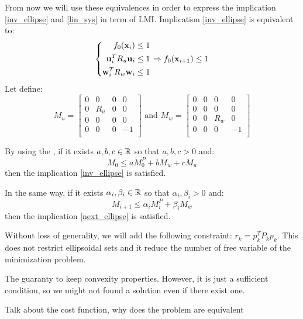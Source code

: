 From now we will use these equivalences in order to express the implication  \ref{inv_ellipse} and \ref{lin_sys} in term of LMI.
Implication \ref{inv_ellipse} is equivalent to:
\begin{equation}
\left\{
\begin{aligned}
f_0( \mathbf{x}_i)   &\leq 1\\
 \mathbf{u}_i^T R_u  \mathbf{u}_i &\leq 1\\
 \mathbf{w}_i^T R_w  \mathbf{w}_i &\leq 1
\end{aligned}
\right.
\Rightarrow
f_0( \mathbf{x}_{i+1}) \leq 1
\end{equation}
Let define:
\begin{equation}
M_u = \begin{bmatrix}
0&0&0&0\\
0&R_u&0&0\\
0&0&0&0\\
0&0&0&-1\\
\end{bmatrix}
\textrm{ and }
M_w = \begin{bmatrix}
0&0&0&0\\
0&0&0&0\\
0&0&R_w&0\\
0&0&0&-1\\
\end{bmatrix}
\end{equation}

By using the \Sproc{}, if it exists $a,b,c \in \mathbb{R}$ so that $a,b,c>0$ and:
\begin{equation}
M_0 \leq a M^P_0 + b M_w + c M_u
\end{equation}
then the implication \ref{inv_ellipse} is satisfied.

\newcommand{\ai}{\alpha_i}
\newcommand{\bi}{\beta_i}
In the same way, if it exists $\ai,\bi \in \R$ so that $\ai,\bi>0$ and:
\begin{equation}
M_{i+1} \leq \ai M^P_i + \bi M_w
\end{equation}
then the implication \ref{next_ellipse} is satisfied.

Without loss of generality, we will add the following constraint: $r_k = p_k^T P_k p_k$. This does not restrict ellipsoidal sets and it reduce the number of free variable of the minimization problem.

The \Sproc{} guaranty to keep convexity properties. However, it is just a sufficient condition, so we might not found a solution even if there exist one.

Talk about the cost function, why does the problem are equivalent

\cite{Polyak200815349}
\cite{LMI_book}

